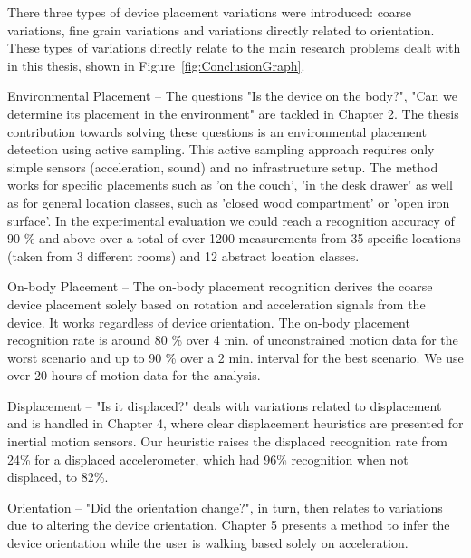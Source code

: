 There three types of device placement variations were introduced: coarse variations, fine grain
variations and variations directly related to orientation. These
types of variations directly relate to the main research problems
dealt with in this thesis, shown in Figure~\ref{fig:ConclusionGraph}.

\begin{description}
\item{Environmental Placement} -- The questions "Is the device on the body?", "Can we determine its
placement in the environment" are tackled in Chapter 2. The thesis contribution towards solving
these questions is an environmental placement detection using active sampling. 
This active sampling approach requires only simple sensors (acceleration,
sound) and no infrastructure setup. The method works for specific
placements such as 'on the couch', 'in the desk drawer' as well as for
general location classes, such as 'closed wood compartment' or 'open
iron surface'. In the experimental evaluation we could reach a
recognition accuracy of 90 \% and above over a total of over 1200 measurements from 35
 specific locations (taken from 3 different rooms) and 12 abstract
 location classes. 
\item{On-body Placement} -- The on-body placement recognition derives the coarse
device placement solely based on rotation and acceleration signals
from the device. It works regardless of device orientation.
 The on-body placement recognition rate is around 80 \%
 over 4 min. of unconstrained motion data for the worst scenario and
 up to 90 \% over a 2 min. interval for the best scenario.
We use over 20 hours of motion data for the analysis.
\item{Displacement} -- "Is it displaced?" deals with variations related
to displacement and is handled in Chapter 4, where clear displacement
heuristics are presented for inertial motion sensors. 
Our heuristic raises the displaced recognition rate
from 24\% for a displaced accelerometer, which had 96\% recognition
 when not displaced, to 82\%. 
\item{Orientation} -- "Did the orientation change?", in turn, then relates to variations due to
altering the device orientation. Chapter 5 presents a method to infer
the device orientation while the user is walking based solely on
acceleration.
\end{description}

